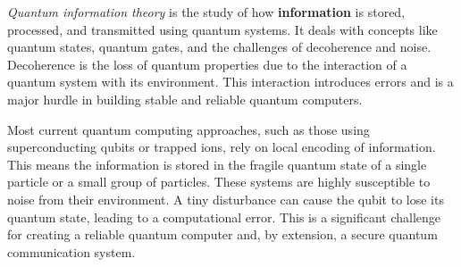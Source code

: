 \documentclass{article}
\begin{document}
\textit{Quantum information theory} is the study of how \textbf{information} is stored, processed, and transmitted using quantum systems. It deals with concepts like quantum states, quantum gates, and the challenges of decoherence and noise. Decoherence is the loss of quantum properties due to the interaction of a quantum system with its environment. This interaction introduces errors and is a major hurdle in building stable and reliable quantum computers.

Most current quantum computing approaches, such as those using superconducting qubits or trapped ions, rely on local encoding of information. This means the information is stored in the fragile quantum state of a single particle or a small group of particles. These systems are highly susceptible to noise from their environment. A tiny disturbance can cause the qubit to lose its quantum state, leading to a computational error. This is a significant challenge for creating a reliable quantum computer and, by extension, a secure quantum communication system.
\end{document}
